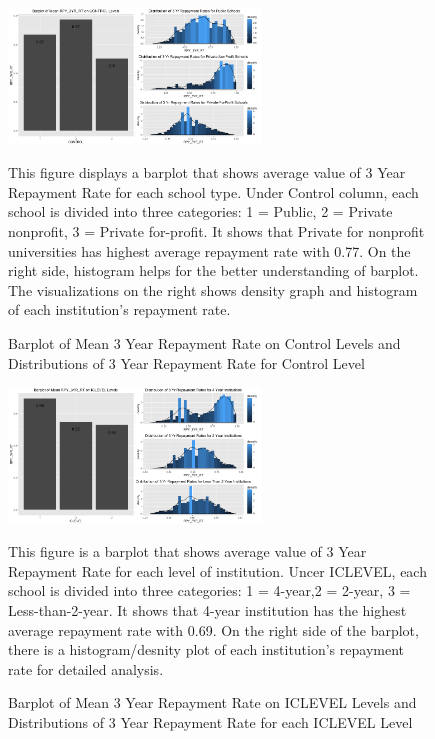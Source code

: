 \documentclass[a4paper]{article}\usepackage[]{graphicx}\usepackage[]{color}
\begin{document}
\begin{figure}
  \centering
  \caption{Barplot of Mean 3 Year Repayment Rate on Control Levels and Distributions of 3 Year Repayment Rate for Control Level}
  \includegraphics[width=0.6\textwidth]{../images/eda/rpy3yr_control_barplot_histogram.png}
  \centering
  \newline
  
  \raggedright
This figure displays a barplot that shows average value of 3 Year Repayment Rate for each school type. Under Control column, each school is divided into three categories: 1 = Public, 2 = Private nonprofit, 3 = Private for-profit. It shows that Private for nonprofit universities has highest average repayment rate with 0.77. On the right side, histogram helps for the better understanding of barplot. The visualizations on the right shows density graph and histogram of each institution's repayment rate.
\end{figure}


\begin{figure}
  \caption{Barplot of Mean 3 Year Repayment Rate on ICLEVEL Levels and Distributions of 3 Year Repayment Rate for each ICLEVEL Level}
  \centering
  \includegraphics[width=0.6\textwidth]{../images/eda/iclevel_rpy3yr_barplot_histogram.png}
  \centering
  \newline
  
  \raggedright
This figure is a barplot that shows average value of 3 Year Repayment Rate for each level of institution. Uncer ICLEVEL, each school is divided into three categories: 1 = 4-year,2 = 2-year, 3 = Less-than-2-year. It shows that 4-year institution has the highest average repayment rate with 0.69. On the right side of the barplot, there is a histogram/desnity plot of each institution's repayment rate for detailed analysis.
\end{figure}
\end{document}
